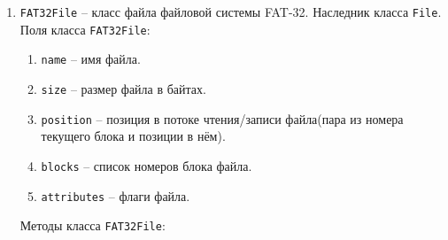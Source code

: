 \begin{enumerate}
\begin{enumerate}
		\begin{enumerate}
		\item \texttt{name} -- название файла.
		\item \texttt{size} -- размер файла в байтах. Для каталогов равно 0.
		\item \texttt{create-date} -- дата создания файла.
		\item \texttt{create-time} -- время создания файла.
		\item \texttt{modify-date} -- дата последнего изменения файла.
		\item \texttt{modify-time} -- время последнего изменения файла.
		\item \texttt{access-date} -- дата последнего доступа файла.
		\item \texttt{access-date} -- всегда имеет значение равное \texttt{nil}.
		\item \texttt{isdir} -- флаг, показывающий, является ли файл каталогом.
		\item \texttt{create-time-ms} -- сотые доли секунды создания файла или каталога(1 байт). Имеет значение от 0 до 199(от 0 до 1.99 секунды с шагом 0.01 секунда).
		\item \texttt{attribute} -- атрибуты файла.
		\end{enumerate}
		
	\item \texttt{new-block} -- добавить новый блок к файлу. Аргументы: \texttt{file-object}(объект файла, к которому необходимо добавить новый блок). Возвращает \texttt{nil}.
		
	\end{enumerate}

\item \texttt{FAT32File} -- класс файла файловой системы FAT-32. Наследник класса \texttt{File}. Поля класса \texttt{FAT32File}:

	\begin{enumerate}
	\item \texttt{name} -- имя файла.
	\item \texttt{size} -- размер файла в байтах.
	\item \texttt{position} -- позиция в потоке чтения/записи файла(пара из номера текущего блока и позиции в нём).
	\item \texttt{blocks} -- список номеров блока файла.
	\item \texttt{attributes} -- флаги файла.
	\end{enumerate}
	
Методы класса \texttt{FAT32File}:


\end{enumerate}
